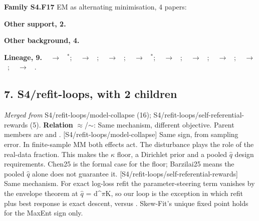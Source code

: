\documentclass[10pt]{article}
\newcommand{\memb}[1]{\par\smallskip\textbf{#1}\quad}
\begin{document}
\memb{Family S4.F17} EM as alternating minimisation, 4 papers: {\footnotesize \citetext{\citealp{Dempster-maximum77}; \citealp{Wu-convergence83}\dag; \citealp{Celeux-classification92}; \citealp{Csiszar-idivergence75}}}

\memb{Other support, 2.} \citetext{\citealp{Byrnes-tight15}; \citealp{Kumar-difference24}\dag}

\memb{Other background, 4.} {\footnotesize \citetext{\citealp{Iyer-algorithms12}; \citealp{Piot-difference16}; \citealp{Karabag-optimal19}; \citealp{Savas-entropy21}}}

\memb{Lineage, 9.} {\footnotesize \citeauthor{Dempster-maximum77}~\citeyear{Dempster-maximum77} $\to$ \citeauthor{Wu-convergence83}~\citeyear{Wu-convergence83}$^\ast$; \citeauthor{Dempster-maximum77}~\citeyear{Dempster-maximum77} $\to$ \citeauthor{Celeux-classification92}~\citeyear{Celeux-classification92}; \citeauthor{Dempster-maximum77}~\citeyear{Dempster-maximum77} $\to$ \citeauthor{LeThi-dc18}~\citeyear{LeThi-dc18}; \citeauthor{Lange-optimization00}~\citeyear{Lange-optimization00} $\to$ \citeauthor{Hunter-tutorial04}~\citeyear{Hunter-tutorial04}$^\ast$; \citeauthor{Yuille-concaveconvex03}~\citeyear{Yuille-concaveconvex03} $\to$ \citeauthor{Sriperumbudur-convergence09}~\citeyear{Sriperumbudur-convergence09}; \citeauthor{Yuille-concaveconvex03}~\citeyear{Yuille-concaveconvex03} $\to$ \citeauthor{LeThi-dc18}~\citeyear{LeThi-dc18}; \citeauthor{Yuille-concaveconvex03}~\citeyear{Yuille-concaveconvex03} $\to$ \citeauthor{Kumar-difference24}~\citeyear{Kumar-difference24}; \citeauthor{Hunter-tutorial04}~\citeyear{Hunter-tutorial04} $\to$ \citeauthor{LeThi-dc18}~\citeyear{LeThi-dc18}; \citeauthor{Iyer-algorithms12}~\citeyear{Iyer-algorithms12} $\to$ \citeauthor{DeSanti-global24}~\citeyear{DeSanti-global24}.}

\subsection{7. S4/refit-loops, with 2 children}\label{node:S4-S4-refit-loops}
\textit{Merged from} S4/refit-loops/model-collapse (16); S4/refit-loops/self-referential-rewards (5). \textbf{Relation} $\approx$/$\sim$: Same mechanism, different objective. Parent members are \citet{Monderer-potential96} and \citet{Robinson-iterative51}. [S4/refit-loops/model-collapse] Same sign, from sampling error. In finite-sample MM both effects act. The disturbance plays the role of the real-data fraction. This makes the \ensuremath{\kappa} floor, a Dirichlet prior and a pooled \ensuremath{\hat{q}} design requirements. Chen25 is the formal case for the floor; Barzilai25 means the pooled \ensuremath{\hat{q}} alone does not guarantee it. [S4/refit-loops/self-referential-rewards] Same mechanism. For exact log-loss refit the parameter-steering term vanishes by the envelope theorem at \ensuremath{\hat{q}} = d\^{}\ensuremath{\pi}K, so our loop is the exception in which refit plus best response is exact descent, versus \citet{Gauthier-explaining26}. Skew-Fit's unique fixed point holds for the MaxEnt sign only.
\end{document}
